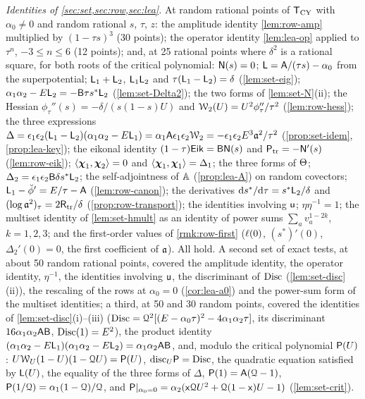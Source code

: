 \emph{Identities of \cref{sec:set,sec:row,sec:lea}.} At random rational points of $\mathsf{T}_{\mathrm{CY}}$ with $\alpha_0\neq 0$ and random rational $s$, $\tau$, $z$: the amplitude identity \cref{lem:row-amp} multiplied by $(1-\tau s)^3$ (30 points); the operator identity \cref{lem:lea-op} applied to $\tau^n$, $-3\leq n\leq 6$ (12 points); and, at 25 rational points where $\delta^2$ is a rational square, for both roots of the critical polynomial: $\mathsf{N}(s)=0$; $\mathsf{L}=\mathsf{A}/(\tau s)-\alpha_0$ from the superpotential; $\mathsf{L}_1+\mathsf{L}_2$, $\mathsf{L}_1\mathsf{L}_2$ and $\tau(\mathsf{L}_1-\mathsf{L}_2)=\delta$ (\cref{lem:set-eig}); $\alpha_1\alpha_2-E\mathsf{L}_2=-\mathsf{B}\tau s^\ast\mathsf{L}_2$ (\cref{lem:set-Delta2}); the two forms of \cref{lem:set-N}(ii); the Hessian $\phi_\tau''(s)=-\delta/(s(1-s)U)$ and $\mathcal{W}_2(U)=U^2\phi_\tau''/\tau^2$ (\cref{lem:row-hess}); the three expressions $\Delta=\epsilon_1\epsilon_2(\mathsf{L}_1-\mathsf{L}_2)(\alpha_1\alpha_2-E\mathsf{L}_1)=\alpha_1\mathsf{A}\epsilon_1\epsilon_2\mathcal{W}_2=-\epsilon_1\epsilon_2E^3\mathfrak{a}^2/\tau^2$ (\cref{prop:set-idem}, \cref{prop:lea-key}); the eikonal identity $(1-\tau)\mathsf{Eik}=\mathsf{B}\mathsf{N}(s)$ and $\mathsf{P}_{\mathrm{tr}}=-\mathsf{N}'(s)$ (\cref{lem:row-eik}); $\langle\boldsymbol{\chi}_1,\boldsymbol{\chi}_2\rangle=0$ and $\langle\boldsymbol{\chi}_1,\boldsymbol{\chi}_1\rangle=\Delta_1$; the three forms of $\Theta$; $\Delta_2=\epsilon_1\epsilon_2\mathsf{B}\delta s^\ast\mathsf{L}_2$; the self-adjointness of $\mathbb{A}$ (\cref{prop:lea-A}) on random covectors; $\mathsf{L}_1-\breve{\phi}'=E/\tau-\mathsf{A}$ (\cref{lem:row-canon}); the derivatives $\mathrm{d} s^\ast/\mathrm{d}\tau=s^\ast\mathsf{L}_2/\delta$ and $(\log\mathfrak{a}^2)_\tau=2\mathsf{R}_{\mathrm{tr}}/\delta$ (\cref{prop:row-transport}); the identities involving $\mathsf{u}$; $\eta\eta^{-1}=1$; the multiset identity of \cref{lem:set-hmult} as an identity of power sums $\sum_av_a^{1-2k}$, $k=1,2,3$; and the first-order values of \cref{rmk:row-first} ($\ell(0)$, $(s^\ast)'(0)$, $\Delta_2'(0)=0$, the first coefficient of $\mathfrak{a}$). All hold. A second set of exact tests, at about 50 random rational points, covered the amplitude identity, the operator identity, $\eta^{-1}$, the identities involving $\mathsf{u}$, the discriminant of $\operatorname{Disc}$ (\cref{lem:set-disc}(ii)), the rescaling of the rows at $\alpha_0=0$ (\cref{cor:lea-a0}) and the power-sum form of the multiset identities; a third, at 50 and 30 random points, covered the identities of \cref{lem:set-disc}(i)--(iii) ($\operatorname{Disc}=\mathcal{Q}^2[(E-\alpha_0\tau)^2-4\alpha_1\alpha_2\tau]$, its discriminant $16\alpha_1\alpha_2\mathsf{A}\mathsf{B}$, $\operatorname{Disc}(1)=E^2$), the product identity $(\alpha_1\alpha_2-E\mathsf{L}_1)(\alpha_1\alpha_2-E\mathsf{L}_2)=\alpha_1\alpha_2\mathsf{A}\mathsf{B}$, and, modulo the critical polynomial $\mathsf{P}(U)$: $U\mathcal{W}_U(1-U)(1-\mathcal{Q} U)=\mathsf{P}(U)$, $\mathrm{disc}_U\mathsf{P}=\operatorname{Disc}$, the quadratic equation satisfied by $\mathsf{L}(U)$, the equality of the three forms of $\Delta$, $\mathsf{P}(1)=\mathsf{A}(\mathcal{Q}-1)$, $\mathsf{P}(1/\mathcal{Q})=\alpha_1(1-\mathcal{Q})/\mathcal{Q}$, and $\mathsf{P}|_{\alpha_0=0}=\alpha_2(\mathsf{x}\mathcal{Q} U^2+\mathcal{Q}(1-\mathsf{x})U-1)$ (\cref{lem:set-crit}).

